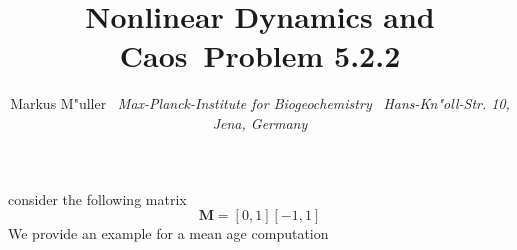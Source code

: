 \documentclass[10pt,a4paper]{article}
\title{Nonlinear Dynamics and Caos\ Problem 5.2.2}
\author{Markus M"{u}ller \
                        {\it Max-Planck-Institute for Biogeochemistry} \
                        {\it Hans-Kn"{o}ll-Str. 10, Jena, Germany}}
\date{}  \n
\begin{document}
        \maketitle
        
      consider the following matrix 
      \[
 \mathbf{M}=      [ 0, 1]
[-1, 1]      \]We provide an example for a mean age  computation 
\end{document}
